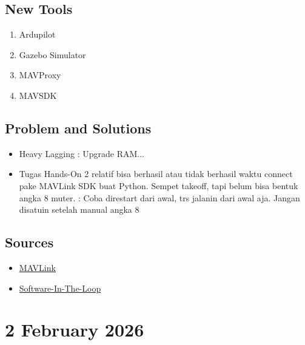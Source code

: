 \documentclass{article}
\begin{document}
\subsection{New Tools}
\begin{enumerate}
    \item Ardupilot
    \item Gazebo Simulator
    \item MAVProxy
    \item MAVSDK
\end{enumerate}

\subsection{Problem and Solutions}
\begin{itemize}
    \item Heavy Lagging : Upgrade RAM... 
    \item Tugas Hands-On 2 relatif bisa berhasil atau tidak berhasil waktu connect pake MAVLink SDK buat Python. Sempet takeoff, tapi belum bisa bentuk angka 8 muter. : Coba direstart dari awal, trs jalanin dari awal aja. Jangan disatuin setelah manual angka 8
\end{itemize}

\subsection{Sources}
\begin{itemize}
    \item \href{https://docs.google.com/presentation/d/1K7dUfzG7IsyPHQzxUrBRzfQ_Fl5hWV3azQlY_Pkpa_c/edit?slide=id.g3bc4d0c4fba_0_337#slide=id.g3bc4d0c4fba_0_337}{MAVLink}
    \item \href{https://docs.google.com/presentation/d/161pANZ7QofLcvcZGOjnbqpXr1FMTQsIl8tuvKL6hG2E/edit?slide=id.g3b4dcdc285d_0_6#slide=id.g3b4dcdc285d_0_6}{Software-In-The-Loop}
\end{itemize}


\section{2 February 2026}
\end{document}
